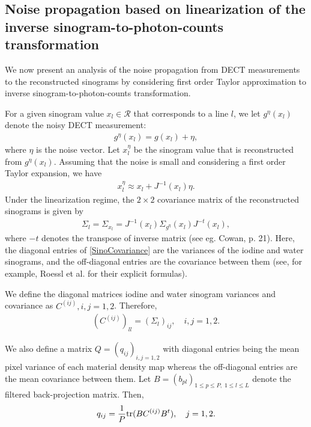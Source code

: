 \documentclass[12pt,twoside]{article}   %
\def\rR{\mathcal{R}}
\def\S{\Sigma}
\begin{document}
\subsection{Noise propagation based on linearization of the inverse sinogram-to-photon-counts transformation}
We now present an analysis of the noise propagation from DECT measurements to the reconstructed sinograms by considering first order Taylor approximation to inverse sinogram-to-photon-counts transformation. 

For a given sinogram value $x_l \in \rR$ that corresponds to a line $l$, we let $g^\eta(x_l)$ denote the noisy DECT measurement:
\begin{align}\label{eq:geta}
    g^\eta(x_l) = g(x_l) + \eta,
\end{align}
where $\eta$ is the noise vector. Let $x_l^{\eta}$ be the sinogram value that is reconstructed from $g^\eta(x_l)$. Assuming that the noise is small and considering a first order Taylor expansion, 
we have
\begin{align}\label{eq:errorx}
    x_l^\eta \approx x_l + J^{-1}(x_l) \eta.
\end{align}
Under the linearization regime, the $2\times 2$ covariance matrix of the reconstructed sinograms is given by
\begin{align}\label{SinoCovariance}
\textstyle \S_l = \S_{x_l} = J^{-1}(x_l) \S_{g^\eta}(x_l) J^{-t}(x_l),
\end{align}
where $-t$ denotes the transpose of inverse matrix (see eg. Cowan, p. 21)\cite{Cowan1998}. Here, the diagonal entries of \eqref{SinoCovariance} are the variances of the iodine and water sinograms, and the off-diagonal entries are the covariance between them (see, for example, Roessl et al. \cite{Roessl2007} for their explicit formulas).

We define the diagonal matrices iodine and water sinogram variances and covariance as $C^{(ij)}, i,j=1,2$. Therefore,
\begin{align}\label{sinovar}
    (C^{(ij)})_{ll} = (\S_l)_{ij}, \quad i,j=1,2.
\end{align}

 We also define a matrix $Q = (q_{ij})_{i,j=1, 2}$ with diagonal entries being the mean pixel variance of each material density map whereas the off-diagonal entries are the mean covariance between them. Let $B = (b_{pl})_{1\leq p\leq P,\; 1\leq l\leq L}$ denote the filtered back-projection matrix. Then,
\begin{align}
    q_{ij} = \frac{1}{P} {\rm{tr}}(BC^{(ij)}B^t), \quad j=1,2.
\end{align}
\end{document}

